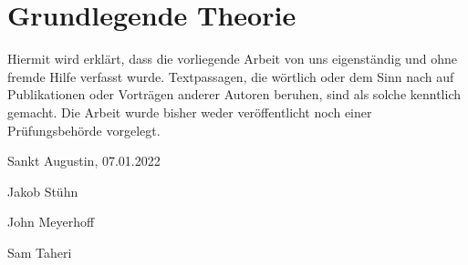 \section{Grundlegende Theorie}

Hiermit wird erklärt, dass die vorliegende Arbeit von uns eigenständig und ohne fremde
Hilfe verfasst wurde. Textpassagen, die wörtlich oder dem Sinn nach auf Publikationen
oder Vorträgen anderer Autoren beruhen, sind als solche kenntlich gemacht.
Die Arbeit wurde bisher weder veröffentlicht noch einer Prüfungsbehörde vorgelegt.

Sankt Augustin, 07.01.2022


\hline
Jakob Stühn




\hline
John Meyerhoff




\hline
Sam Taheri

\pagebreak
